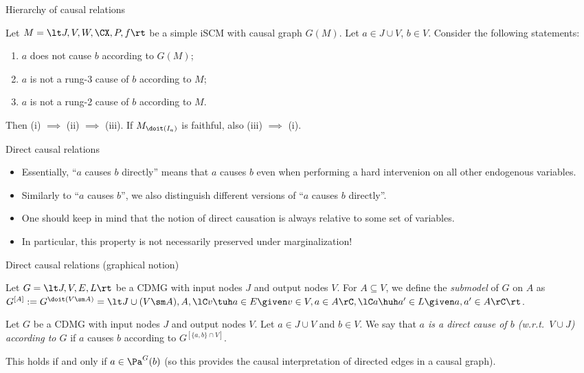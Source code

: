 \begin{frame}{Hierarchy of causal relations}

\begin{Thm}[\ref{thm:scm_causes}]
  Let $M = \lt J, V, W, \CX, P, f \rt$ be a simple iSCM with causal graph $G(M)$.
  Let $a \in J \cup V$, $b \in V$. Consider the following statements:
  \begin{enumerate}
    \item[(i)] $a$ does not cause $b$ according to $G(M)$;
    \item[(ii)] $a$ is not a rung-3 cause of $b$ according to $M$;
    \item[(iii)] $a$ is not a rung-2 cause of $b$ according to $M$.
  \end{enumerate}
  Then (i) $\implies$ (ii) $\implies$ (iii). If $M_{\doit(I_a)}$ is faithful, also (iii) $\implies$ (i).
\end{Thm}
\end{frame}

\begin{frame}{Direct causal relations}
  \begin{itemize}
    \item Essentially, ``$a$ causes $b$ directly'' means that $a$ causes $b$ even when performing a hard intervenion on all other endogenous variables.
    \item Similarly to ``$a$ causes $b$'', we also distinguish different versions of ``$a$ causes $b$ directly''.
    \item One should keep in mind that the notion of direct causation is always relative to some set of variables.
    \item In particular, this property is not necessarily preserved under marginalization!
  \end{itemize}
\end{frame}

\begin{frame}{Direct causal relations (graphical notion)}
\begin{Def}[\ref{def:graph_submodel}]
  Let $G = \lt J, V, E, L \rt$ be a CDMG with input nodes $J$ and output nodes $V$.
  For $A \subseteq V$, we define the \emph{submodel} of $G$ on $A$ as $G^{[A]} := G^{\doit(V\sm A)} = \lt J \cup (V \sm A), A, \lC v \tuh a \in E \given v \in V, a \in A \rC, \lC a \huh a' \in L \given a,a' \in A \rC \rt$.
\end{Def}
\begin{Def}[\ref{def:graph_direct_cause_of}]
  Let $G$ be a CDMG with input nodes $J$ and output nodes $V$.
  Let $a \in J \cup V$ and $b \in V$.
  We say that \emph{$a$ is a direct cause of $b$ (w.r.t.\ $V \cup J$) according to $G$} if $a$ causes $b$ according to $G^{[\{a,b\}\cap V]}$.
\end{Def}
  This holds if and only if $a \in \Pa^{G}(b)$
  (so this provides the causal interpretation of directed edges in a causal graph).
\end{frame}

